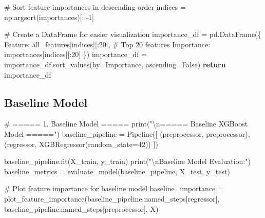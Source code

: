 \documentclass[
  letterpaper,
  DIV=11,
  numbers=noendperiod]{scrreprt}
\newenvironment{Shaded}{\begin{snugshade}}{\end{snugshade}}
\newcommand{\BuiltInTok}[1]{\textcolor[rgb]{0.00,0.23,0.31}{#1}}
\newcommand{\CharTok}[1]{\textcolor[rgb]{0.13,0.47,0.30}{#1}}
\newcommand{\CommentTok}[1]{\textcolor[rgb]{0.37,0.37,0.37}{#1}}
\newcommand{\ControlFlowTok}[1]{\textcolor[rgb]{0.00,0.23,0.31}{\textbf{#1}}}
\newcommand{\DecValTok}[1]{\textcolor[rgb]{0.68,0.00,0.00}{#1}}
\newcommand{\NormalTok}[1]{\textcolor[rgb]{0.00,0.23,0.31}{#1}}
\newcommand{\OperatorTok}[1]{\textcolor[rgb]{0.37,0.37,0.37}{#1}}
\newcommand{\StringTok}[1]{\textcolor[rgb]{0.13,0.47,0.30}{#1}}
\newcommand{\VariableTok}[1]{\textcolor[rgb]{0.07,0.07,0.07}{#1}}
\begin{document}
\begin{Shaded}
\begin{Highlighting}[]
        \CommentTok{\# Sort feature importances in descending order}
\NormalTok{        indices }\OperatorTok{=}\NormalTok{ np.argsort(importances)[::}\OperatorTok{{-}}\DecValTok{1}\NormalTok{]}
        
        \CommentTok{\# Create a DataFrame for easier visualization}
\NormalTok{        importance\_df }\OperatorTok{=}\NormalTok{ pd.DataFrame(\{}
            \StringTok{\textquotesingle{}Feature\textquotesingle{}}\NormalTok{: all\_features[indices][:}\DecValTok{20}\NormalTok{],  }\CommentTok{\# Top 20 features}
            \StringTok{\textquotesingle{}Importance\textquotesingle{}}\NormalTok{: importances[indices][:}\DecValTok{20}\NormalTok{]}
\NormalTok{        \})}
\NormalTok{        importance\_df }\OperatorTok{=}\NormalTok{ importance\_df.sort\_values(by}\OperatorTok{=}\StringTok{\textquotesingle{}Importance\textquotesingle{}}\NormalTok{, ascending}\OperatorTok{=}\VariableTok{False}\NormalTok{)}
        \ControlFlowTok{return}\NormalTok{ importance\_df}
\end{Highlighting}
\end{Shaded}

\subsection{Baseline Model}\label{baseline-model}

\begin{Shaded}
\begin{Highlighting}[]
\CommentTok{\# ===== 1. Baseline Model =====}
\BuiltInTok{print}\NormalTok{(}\StringTok{"}\CharTok{\textbackslash{}n}\StringTok{===== Baseline XGBoost Model ====="}\NormalTok{)}
\NormalTok{baseline\_pipeline }\OperatorTok{=}\NormalTok{ Pipeline([}
\NormalTok{    (}\StringTok{\textquotesingle{}preprocessor\textquotesingle{}}\NormalTok{, preprocessor),}
\NormalTok{    (}\StringTok{\textquotesingle{}regressor\textquotesingle{}}\NormalTok{, XGBRegressor(random\_state}\OperatorTok{=}\DecValTok{42}\NormalTok{))}
\NormalTok{])}

\NormalTok{baseline\_pipeline.fit(X\_train, y\_train)}
\BuiltInTok{print}\NormalTok{(}\StringTok{"}\CharTok{\textbackslash{}n}\StringTok{Baseline Model Evaluation:"}\NormalTok{)}
\NormalTok{baseline\_metrics }\OperatorTok{=}\NormalTok{ evaluate\_model(baseline\_pipeline, X\_test, y\_test)}

\CommentTok{\# Plot feature importance for baseline model}
\NormalTok{baseline\_importance }\OperatorTok{=}\NormalTok{ plot\_feature\_importance(baseline\_pipeline.named\_steps[}\StringTok{\textquotesingle{}regressor\textquotesingle{}}\NormalTok{], }
\NormalTok{                                             baseline\_pipeline.named\_steps[}\StringTok{\textquotesingle{}preprocessor\textquotesingle{}}\NormalTok{], }
\NormalTok{                                             X)}
\end{Highlighting}
\end{Shaded}
\end{document}
